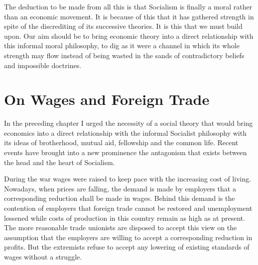 \documentclass{book}
\begin{document}
The deduction to be made from all this is that Socialism is finally a moral rather than an economic movement. It is because of this that it has gathered strength in spite of the discrediting of its successive theories. It is this that we must build upon. Our aim should be to bring economic theory into a direct relationship with this informal moral philosophy, to dig as it were a channel in which its whole strength may flow instead of being wasted in the sands of contradictory beliefs and impossible doctrines.

\chapter{On Wages and Foreign Trade}
\label{chapter-2}
In the preceding chapter I urged the necessity of a social theory that would bring economics into a direct relationship with the informal Socialist philosophy with its ideas of brotherhood, mutual aid, fellowship and the common life. Recent events have brought into a new prominence the antagonism that exists between the head and the heart of Socialism.

During the war wages were raised to keep pace with the increasing cost of living. Nowadays, when prices are falling, the demand is made by employers that a corresponding reduction shall be made in wages. Behind this demand is the contention of employers that foreign trade cannot be restored and unemployment lessened while costs of production in this country remain as high as at present. The more reasonable trade unionists are disposed to accept this view on the assumption that the employers are willing to accept a corresponding reduction in profits. But the extremists refuse to accept any lowering of existing standards of wages without a struggle.
\end{document}
